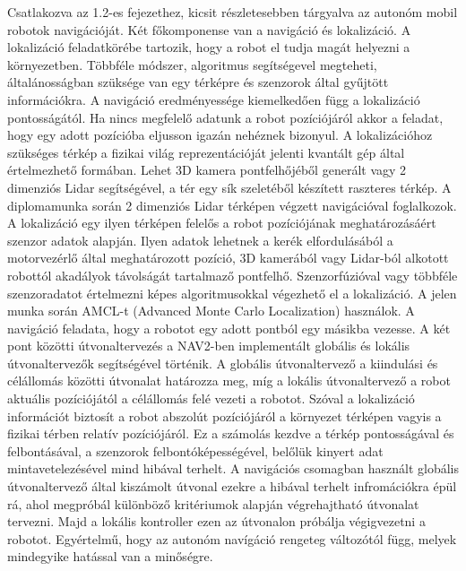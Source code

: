Csatlakozva az 1.2-es fejezethez, kicsit részletesebben tárgyalva az autonóm mobil robotok navigációját. Két főkomponense van a navigáció és lokalizáció. A lokalizáció feladatkörébe tartozik, hogy a robot el tudja magát helyezni a környezetben. Többféle módszer, algoritmus segítségevel megteheti, általánosságban szüksége van egy térképre és szenzorok által gyűjtött információkra. A navigáció eredményessége kiemelkedően függ a lokalizáció pontosságától. Ha nincs megfelelő adatunk a robot pozíciójáról akkor a feladat, hogy egy adott pozícióba eljusson igazán nehéznek bizonyul. A lokalizációhoz szükséges térkép a fizikai világ reprezentációját jelenti kvantált gép által értelmezhető formában. Lehet 3D kamera pontfelhőjéből generált vagy 2 dimenziós Lidar segítségével, a tér egy sík szeletéből készített raszteres térkép. A diplomamunka során 2 dimenziós Lidar térképen végzett navigációval foglalkozok. A lokalizáció egy ilyen térképen felelős a robot pozíciójának meghatározásáért szenzor adatok alapján. Ilyen adatok lehetnek a kerék elfordulásából a motorvezérlő által meghatározott pozíció, 3D kamerából vagy Lidar-ból alkotott robottól akadályok távolságát tartalmaző pontfelhő. Szenzorfúzióval vagy többféle szenzoradatot értelmezni képes algoritmusokkal végezhető el a lokalizáció. A jelen munka során AMCL-t (Advanced Monte Carlo Localization) használok. A navigáció feladata, hogy a robotot egy adott pontból egy másikba vezesse. A két pont közötti útvonaltervezés a NAV2-ben implementált globális és lokális útvonaltervezők segítségével történik. A globális útvonaltervező a kiindulási és célállomás közötti útvonalat határozza meg, míg a lokális útvonaltervező a robot aktuális pozíciójától a célállomás felé vezeti a robotot. Szóval a lokalizáció információt biztosít a robot abszolút pozíciójáról a környezet térképen vagyis a fizikai térben relatív pozíciójáról. Ez a számolás kezdve a térkép pontosságával és felbontásával, a szenzorok felbontóképességével, belőlük kinyert adat mintavetelezésével mind hibával terhelt. A navigációs csomagban használt globális útvonaltervező által kiszámolt útvonal ezekre a hibával terhelt infromációkra épül rá, ahol megpróbál különböző kritériumok alapján végrehajtható útvonalat tervezni. Majd a lokális kontroller ezen az útvonalon próbálja végigvezetni a robotot. Egyértelmű, hogy az autonóm navígáció rengeteg változótól függ, melyek mindegyike hatással van a minőségre.

